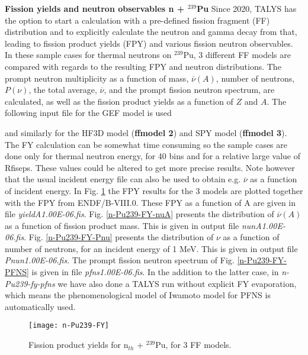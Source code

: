 \begin{samplecase}
{\bf Fission yields and neutron observables n + ${}^{239}$Pu}\newline
Since 2020, TALYS has the option to start a calculation with a pre-defined fission fragment (FF) distribution and to explicitly 
calculate the neutron and gamma decay from that, leading to fission product yields (FPY) and various fission neutron observables. 
In these sample cases for thermal neutrons on ${}^{239}$Pu, 3 different FF models are compared with regards to the resulting 
FPY and neutron distributions. The prompt neutron multiplicity as a function of mass, 
$\overline{\nu}(A)$, number of neutrons, $P({\nu})$, the total average,
$\overline{\nu}$, and the prompt fission neutron spectrum,
are calculated, as well as the fission product yields as a 
function of $Z$ and $A$.
The following input file for the GEF model is used


and similarly for the HF3D model ({\bf ffmodel 2}) and SPY model ({\bf ffmodel 3}).
The FY calculation can be somewhat time consuming so the sample cases are done only for thermal neutron energy, for 40 bins and for a relative large value of Rfiseps. These values could be altered to get more precise results.
Note however that the usual incident energy file can also be used to obtain e.g. $\overline{\nu}$ as a function of incident energy.
In Fig. \ref{n-Pu239-FY} the FPY results for the 3 models are plotted together with the FPY from ENDF/B-VIII.0. These FPY as a function of A are given in file {\it yieldA1.00E-06.fis}.
Fig. \ref{n-Pu239-FY-nuA} presents the distribution of $\overline{\nu}(A)$ as a function of fission product mass. This is given in output 
file {\it nunA1.00E-06.fis}.
Fig. \ref{n-Pu239-FY-Pnu} presents the distribution of $\nu$ as a function of number of neutrons, for an incident energy of 1 MeV. This is given in output 
file {\it Pnun1.00E-06.fis}.
The prompt fission neutron spectrum of Fig. \ref{n-Pu239-FY-PFNS} is given in file {\it pfns1.00E-06.fis}.
In the addition to the latter case, in {\it n-Pu239-fy-pfns} we have also done a TALYS run without explicit FY evaporation, 
which means the phenomenological model of Iwamoto model for PFNS is automatically used.
\end{samplecase}
\begin{figure}
\centering\texttt{[image: n-Pu239-FY]}
\caption{Fission product yields for  n$_{th}$ + $^{239}$Pu, for 3 FF models.}
\label{n-Pu239-FY}
\end{figure}
